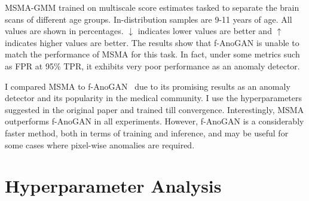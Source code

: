 \begin{table}[tbhp]
\caption{MSMA-GMM trained on multiscale score estimates tasked to separate the brain scans of different age groups. In-distribution samples are 9-11 years of age. All values are shown in percentages. $\downarrow$ indicates lower values are better and $\uparrow$ indicates higher values are better. The results show that f-AnoGAN is unable to match the performance of MSMA for this task. In fact, under some metrics such as FPR at 95\% TPR, it exhibits very poor performance as an anomaly detector.}

\label{brain_perf}
\end{table}

I compared MSMA to f-AnoGAN~\cite{schlegl2019f} due to its promising results as an anomaly detector and its popularity in the medical community. I use the hyperparameters suggested in the original paper and trained till convergence. Interestingly, MSMA outperforms f-AnoGAN in all experiments. However, f-AnoGAN is a considerably faster method, both in terms of training and inference, and may be useful for some cases where pixel-wise anomalies are required.


\section{Hyperparameter Analysis}
\label{hyperparams}

